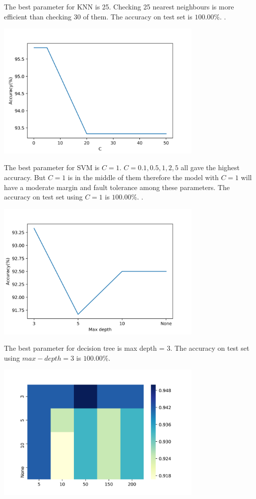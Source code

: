 \documentclass[12pt]{article}
\begin{document}
The best parameter for KNN is 25. Checking 25 nearest neighbours is more efficient than checking 30 of them. The accuracy on test set is $100.00\%$.
\newpage
{}.
\begin{center}
    \includegraphics[width=10cm]{Q3.png}
\end{center}
The best parameter for SVM is $C=1$. $C=0.1,0.5,1,2,5$ all gave the highest accuracy. But $C=1$ is in the middle of them therefore the model with $C=1$ will have a moderate margin and fault tolerance among these parameters. The accuracy on test set using $C=1$ is $100.00\%$.
\newpage
{}.
\begin{center}
    \includegraphics[width=10cm]{Q4a.png}
\end{center}
The best parameter for decision tree is max depth = 3. The accuracy on test set using $max-depth=3$ is $100.00\%$.
\begin{center}
    \includegraphics[width=10cm]{Q4b.png}
\end{center}
\end{document}
